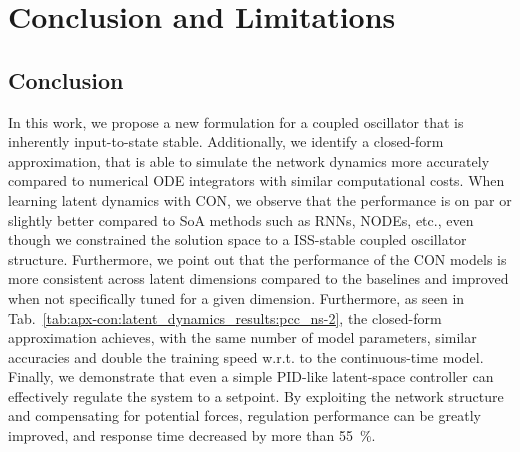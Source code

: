 \section{Conclusion and Limitations}\label{sec:con:conclusion_and_limitations}

\subsection{Conclusion} In this work, we propose a new formulation for a coupled oscillator that is inherently input-to-state stable. Additionally, we identify a closed-form approximation, that is
able to simulate the network dynamics more accurately compared to numerical \gls{ODE} integrators with similar computational costs.
When learning latent dynamics with \gls{CON}, we observe that the performance is on par or slightly better compared to SoA methods such as \glspl{RNN}, \glspl{NODE}, etc., even though we constrained the solution space to a \gls{ISS}-stable coupled oscillator structure. Furthermore, we point out that the performance of the \gls{CON} models is more consistent across latent dimensions compared to the baselines and improved when not specifically tuned for a given dimension.
Furthermore, as seen in Tab.~\ref{tab:apx-con:latent_dynamics_results:pcc_ns-2}, the closed-form approximation achieves, with the same number of model parameters, similar accuracies and double the training speed w.r.t. to the continuous-time model.
Finally, we demonstrate that even a simple PID-like latent-space controller can effectively regulate the system to a setpoint. By exploiting the network structure and compensating for potential forces, regulation performance can be greatly improved, and response time decreased by more than \SI{55}{\percent}.

